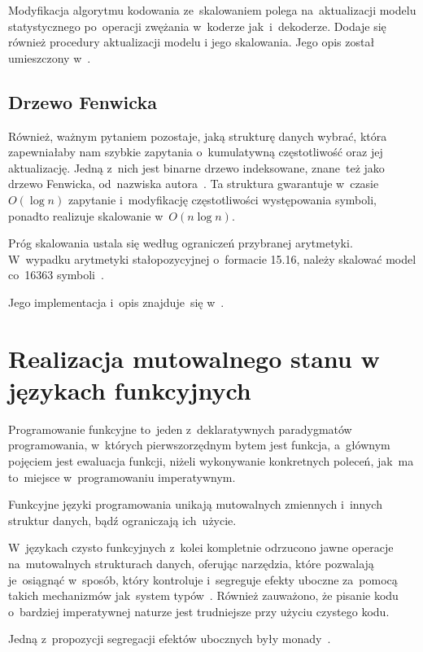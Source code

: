 \documentclass[../../praca.tex]{subfiles}
\begin{document}
Modyfikacja algorytmu kodowania ze~skalowaniem polega na~aktualizacji
modelu statystycznego po~operacji zwężania w~koderze jak~i~dekoderze.
Dodaje się również procedury aktualizacji modelu i jego skalowania.
Jego opis został umieszczony w~\cite{Sayood:IDC}.

\subsection{Drzewo Fenwicka}

Również, ważnym pytaniem pozostaje, jaką strukturę danych wybrać, która
zapewniałaby nam szybkie zapytania o~kumulatywną częstotliwość oraz
jej aktualizację. Jedną z~nich jest binarne drzewo indeksowane, 
znane~też jako drzewo Fenwicka, od~nazwiska autora~\cite{Fenwick:FT}.
Ta struktura gwarantuje w~czasie~\( O (\log n) \) zapytanie i~modyfikację
częstotliwości występowania symboli, ponadto realizuje skalowanie w~\( O (n \log n) \).

Próg skalowania ustala się według ograniczeń przybranej arytmetyki. 
W~wypadku arytmetyki stałopozycyjnej o~formacie 15.16, należy skalować
model co~16363 symboli~\cite{Fenwick:FT}.

Jego implementacja i~opis znajduje~się w~\cite{Fenwick:FT}.

\section{Realizacja mutowalnego stanu w językach funkcyjnych}

Programowanie funkcyjne to~jeden z~deklaratywnych paradygmatów programowania,
w~których pierwszorzędnym bytem jest funkcja, a~głównym pojęciem
jest ewaluacja funkcji, niżeli wykonywanie konkretnych poleceń,
jak~ma to~miejsce w~programowaniu imperatywnym.~\cite{Hudak:Conception}

Funkcyjne języki programowania unikają mutowalnych zmiennych i~innych 
struktur danych, bądź ograniczają ich~użycie.

W~językach czysto funkcyjnych z~kolei kompletnie odrzucono
jawne operacje na~mutowalnych strukturach danych, oferując narzędzia,
które pozwalają je~osiągnąć w~sposób, który kontroluje i~segreguje
efekty uboczne za~pomocą takich mechanizmów jak~system typów~\cite{Hudak:Conception}.
Również zauważono, że pisanie kodu o~bardziej imperatywnej naturze jest
trudniejsze przy użyciu czystego kodu.

Jedną z~propozycji segregacji efektów ubocznych były monady~\cite{Wadler:MFP}.
\end{document}
